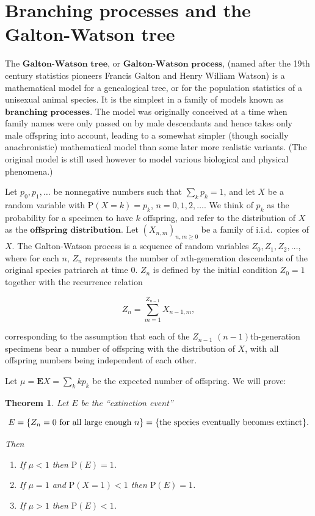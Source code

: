 \documentclass[11pt]{report}
\theoremstyle{plain}
\newtheorem{thm}{Theorem}[chapter]
\theoremstyle{definition}
\begin{document}
\section{Branching processes and the Galton-Watson tree}
The $\textbf{Galton-Watson tree}$, or $\textbf{Galton-Watson process}$, (named after the 19th century statistics pioneers Francis Galton and Henry William Watson) is a mathematical model for a genealogical tree, or for the population statistics of a unisexual animal species. It is the simplest in a family of models known as $\textbf{branching processes}$. The model was originally conceived at a time when family names were only passed on by male descendants and hence takes only male offspring into account, leading to a somewhat simpler (though socially anachronistic) mathematical model than some later more realistic variants.  (The original model is still used however to model various biological and physical phenomena.)

Let $p_0, p_1, \ldots$ be nonnegative numbers such that $\sum_k p_k = 1$, and let $X$ be a random variable with $\mathrm{P}(X=k)=p_k$, $n=0,1,2,\ldots$. We think of $p_k$ as the probability for a specimen to have $k$ offspring, and refer to the distribution of $X$ as the $\textbf{offspring distribution}$. Let $(X_{n,m})_{n,m\ge 0}$ be a family of i.i.d.\ copies of $X$. The Galton-Watson process is a sequence of random variables $Z_0, Z_1, Z_2, \ldots$, where for each $n$, $Z_n$ represents the number of $n$th-generation descendants of the original species patriarch at time $0$. $Z_n$ is defined by the initial condition $Z_0=1$ together with the recurrence relation

\[
Z_n = \sum_{m=1}^{Z_{n-1}} X_{n-1,m},
\]

corresponding to the assumption that each of the $Z_{n-1}$ $(n-1)$th-generation specimens bear a number of offspring with the distribution of $X$, with all offspring numbers being independent of each other.

Let $\mu=\mathbf{E} X = \sum_k k p_k$ be the expected number of offspring. We will prove:

\begin{thm}
\label{thm-galton-watson}
Let $E$ be the ``extinction event''

\[
E = \{ Z_n=0 \textnormal{ for all large enough }n\} = \{ \textnormal{the species eventually becomes extinct} \}.
\]

Then

\begin{enumerate}[label=\arabic*.]
\item If $\mu< 1$ then $\mathrm{P}(E) = 1$.
\item If $\mu=1$ and $\mathrm{P}(X=1)<1$ then $\mathrm{P}(E)=1$.
\item If $\mu>1$ then $\mathrm{P}(E)<1$.
\end{enumerate}

\end{thm}
\end{document}
